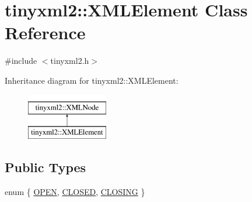 \hypertarget{classtinyxml2_1_1_x_m_l_element}{\section{tinyxml2\+:\+:X\+M\+L\+Element Class Reference}
\label{classtinyxml2_1_1_x_m_l_element}
}


{\ttfamily \#include $<$tinyxml2.\+h$>$}

Inheritance diagram for tinyxml2\+:\+:X\+M\+L\+Element\+:\begin{figure}[H]
\begin{center}
\leavevmode
\includegraphics[height=2.000000cm]{classtinyxml2_1_1_x_m_l_element}
\end{center}
\end{figure}
\subsection*{Public Types}
\begin{DoxyCompactItemize}
\item 
enum \{ \hyperlink{classtinyxml2_1_1_x_m_l_element_a09dda8506daf6772341f1b38abe634fea78cf277c55b4655c86458dfecb11d349}{O\+P\+E\+N}, 
\hyperlink{classtinyxml2_1_1_x_m_l_element_a09dda8506daf6772341f1b38abe634feaa2f1f384020d2d4538ad2ec84930a028}{C\+L\+O\+S\+E\+D}, 
\hyperlink{classtinyxml2_1_1_x_m_l_element_a09dda8506daf6772341f1b38abe634feaa2857344b98a931536c443cd0cadc4b7}{C\+L\+O\+S\+I\+N\+G}
 \}
\end{DoxyCompactItemize}
